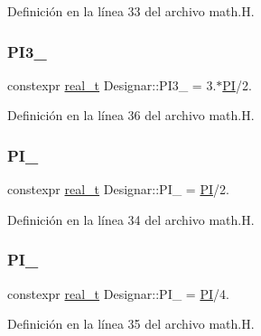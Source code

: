 Definición en la línea 33 del archivo math.\+H.

\mbox{\label{namespace_designar_acdac587da03b3c280ba8c4b2ef3f6983}} 
\subsubsection{\texorpdfstring{P\+I3\+\_}{PI3\_2}}
{\footnotesize\ttfamily constexpr \hyperlink{namespace_designar_aca2c32af26808dbec1f3a3071fad25ce}{real\+\_\+t} Designar\+::\+P\+I3\+\_ = 3.$\ast$\hyperlink{namespace_designar_a2085e876f193b2212cd11dd2770b2d0b}{PI}/2.}



Definición en la línea 36 del archivo math.\+H.

\mbox{\label{namespace_designar_a06ae46c26bfae21d3284882e3f5b9f60}} 
\subsubsection{\texorpdfstring{P\+I\+\_}{PI\_2}}
{\footnotesize\ttfamily constexpr \hyperlink{namespace_designar_aca2c32af26808dbec1f3a3071fad25ce}{real\+\_\+t} Designar\+::\+P\+I\+\_ = \hyperlink{namespace_designar_a2085e876f193b2212cd11dd2770b2d0b}{PI}/2.}



Definición en la línea 34 del archivo math.\+H.

\mbox{\label{namespace_designar_a5d073eb77d1d0886610584ee1441d8de}} 
\subsubsection{\texorpdfstring{P\+I\+\_}{PI\_4}}
{\footnotesize\ttfamily constexpr \hyperlink{namespace_designar_aca2c32af26808dbec1f3a3071fad25ce}{real\+\_\+t} Designar\+::\+P\+I\+\_ = \hyperlink{namespace_designar_a2085e876f193b2212cd11dd2770b2d0b}{PI}/4.}



Definición en la línea 35 del archivo math.\+H.

